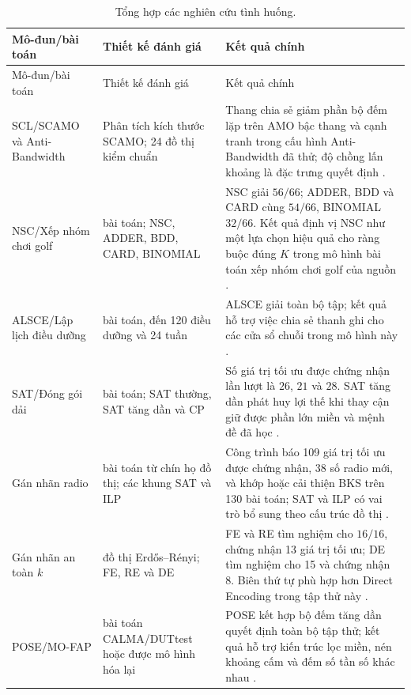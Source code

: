 \begin{longtable}{@{}
>{\raggedright\arraybackslash}p{}
>{\raggedright\arraybackslash}p{}
>{\raggedright\arraybackslash}p{}@{}}
\caption{Tổng hợp các nghiên cứu tình huống.}
\label{tab:reported-evidence-map}\\
\toprule
Mô-đun/bài toán & Thiết kế đánh giá & Kết quả chính\\
\midrule
\endfirsthead
\toprule
Mô-đun/bài toán & Thiết kế đánh giá & Kết quả chính\\
\midrule
\endhead
SCL/SCAMO và Anti-Bandwidth &
Phân tích kích thước SCAMO; 24 đồ thị kiểm chuẩn &
Thang chia sẻ giảm phần bộ đếm lặp trên AMO bậc thang và cạnh tranh trong
cấu hình Anti-Bandwidth đã thử; độ chồng lấn khoảng là đặc trưng quyết định
\parencite{truong2025scamo}.\\

NSC/Xếp nhóm chơi golf &
66 bài toán; NSC, ADDER, BDD, CARD, BINOMIAL &
NSC giải \(56/66\); ADDER, BDD và CARD cùng \(54/66\), BINOMIAL \(32/66\).
Kết quả định vị NSC như một lựa chọn hiệu quả cho ràng buộc đúng \(K\) trong mô hình
bài toán xếp nhóm chơi golf của nguồn \parencite{kieu2026golfer}.\\

ALSCE/Lập lịch điều dưỡng &
28 bài toán, đến 120 điều dưỡng và 24 tuần &
ALSCE giải toàn bộ tập; kết quả hỗ trợ việc chia sẻ thanh ghi cho các cửa sổ
chuỗi trong mô hình này \parencite{truong2025nurse}.\\

SAT/Đóng gói dải &
41 bài toán; SAT thường, SAT tăng dần và CP &
Số giá trị tối ưu được chứng nhận lần lượt là \(26\), \(21\) và \(28\). SAT
tăng dần phát huy lợi thế khi thay cận giữ được phần lớn miền và mệnh đề đã học
\parencite{kieu2025strip}.\\

Gán nhãn radio &
146 bài toán từ chín họ đồ thị; các khung SAT và ILP &
Công trình báo 109 giá trị tối ưu được chứng nhận, 38 số radio mới, và khớp
hoặc cải thiện BKS trên 130 bài toán; SAT và ILP có vai trò bổ sung theo cấu
trúc đồ thị
\parencite{thanh2026radio}.\\

Gán nhãn an toàn \(k\) &
16 đồ thị Erdős--Rényi; FE, RE và DE &
FE và RE tìm nghiệm cho \(16/16\), chứng nhận 13 giá trị tối ưu; DE tìm nghiệm
cho 15 và chứng nhận 8. Biên thứ tự phù hợp hơn Direct Encoding trong tập thử
này \parencite{thanh2026ksafe}.\\

POSE/MO-FAP &
35 bài toán CALMA/DUTtest hoặc được mô hình hóa lại &
POSE kết hợp bộ đếm tăng dần quyết định toàn bộ tập thử; kết quả hỗ trợ
kiến trúc lọc miền, nén khoảng cấm và đếm số tần số khác nhau
\parencite{dao2026mofap}.\\
\bottomrule
\end{longtable}

